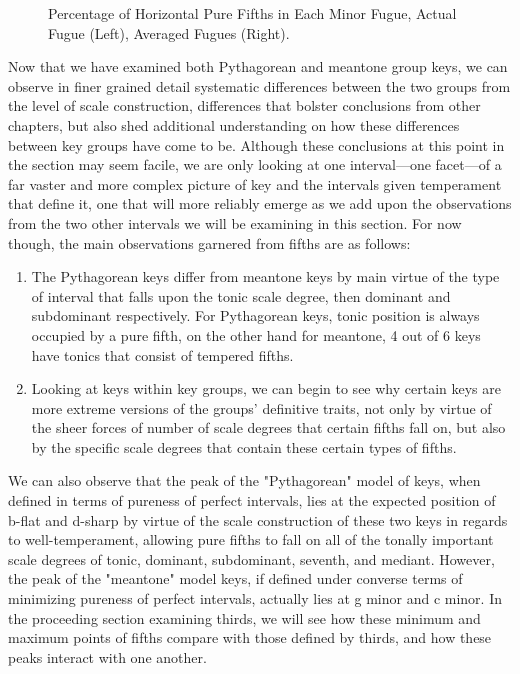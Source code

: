 \begin{figure}[H]
\vspace{1.5em}
    \centering
    \caption[Percentage of Horizontal Pure Fifths in Each Minor Fugue. ]{Percentage of Horizontal Pure Fifths in Each Minor Fugue, Actual Fugue (Left), Averaged Fugues (Right).}
\end{figure}    Now that we have examined both Pythagorean and meantone group keys, we
can observe in finer grained detail systematic differences between the
two groups from the level of scale construction, differences that
bolster conclusions from other chapters, but also shed additional
understanding on how these differences between key groups have come to
be. Although these conclusions at this point in the section may seem
facile, we are only looking at one interval---one facet---of a
far vaster and more complex picture of key and the intervals given
temperament that define it, one that will more reliably emerge as we add
upon the observations from the two other intervals we will be examining
in this section. For now though, the main observations garnered from
fifths are as follows:

\begin{enumerate}
\def\labelenumi{\arabic{enumi}.}
\tightlist
\item
  The Pythagorean keys differ from meantone keys by main virtue of the
  type of interval that falls upon the tonic scale degree, then dominant
  and subdominant respectively. For Pythagorean keys, tonic position is
  always occupied by a pure fifth, on the other hand for meantone, 4 out
  of 6 keys have tonics that consist of tempered fifths.
\item
  Looking at keys within key groups, we can begin to see why certain
  keys are more extreme versions of the groups' definitive traits, not
  only by virtue of the sheer forces of number of scale degrees that
  certain fifths fall on, but also by the specific scale degrees that
  contain these certain types of fifths.
\end{enumerate}

We can also observe that the peak of the "Pythagorean" model of keys,
when defined in terms of pureness of perfect intervals, lies at the
expected position of b-flat and d-sharp by virtue of the scale
construction of these two keys in regards to well-temperament, allowing
pure fifths to fall on all of the tonally important scale degrees of
tonic, dominant, subdominant, seventh, and mediant. However, the peak of
the "meantone" model keys, if defined under converse terms of minimizing
pureness of perfect intervals, actually lies at g minor and c minor. In
the proceeding section examining thirds, we will see how these minimum
and maximum points of fifths compare with those defined by thirds, and
how these peaks interact with one another.

